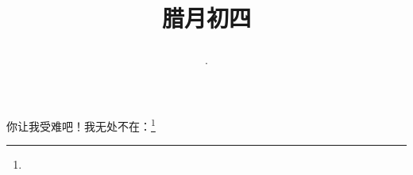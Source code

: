 \title{\date[d=14,m=1,y=2024][year:cn-y,年,month:cn,day:cn,日,·,weekday]·腊月初四 }
你让我受难吧！我无处不在：\footnote{ }


